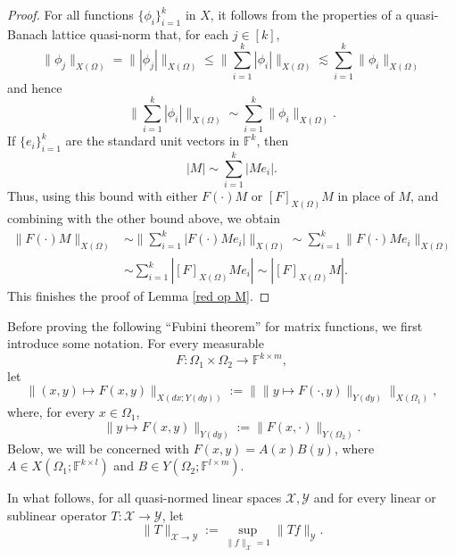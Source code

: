 \documentclass[11pt, reqno]{amsart}
\theoremstyle{definition}
\theoremstyle{remark}
\numberwithin{equation}{section}
\newcommand{\F}{\mathbb F}
\begin{document}
\begin{proof}
For all functions $\{\phi_i\}_{i=1}^k$ in $X$,
it follows from the properties of a
quasi-Banach lattice quasi-norm that, for each $j\in[k]$,
$$
\|\phi_j\|_{X(\Omega)}=\big\| |\phi_j| \big\|_{X(\Omega)} \leq\Bigg\|\sum_{i=1}^k|\phi_i|\Bigg\|_{X(\Omega)}
\lesssim \sum_{i=1}^k\|\phi_i\|_{X(\Omega)}
$$
and hence
$$
\Bigg\|\sum_{i=1}^k|\phi_i|\Bigg\|_{X(\Omega)}
\sim \sum_{i=1}^k\|\phi_i\|_{X(\Omega)}.
$$
If $\{e_i\}_{i=1}^k$ are the standard unit vectors in $\F^k$, then
\begin{equation*}
|M|\sim\sum_{i=1}^k |Me_i|.
\end{equation*}
Thus, using this bound with either $F(\cdot)M$ or $[F]_{X(\Omega)}M$ in place of $M$, and combining with the other bound above, we obtain
\begin{align*}
\|F(\cdot)M\|_{X(\Omega)}
&\sim\Bigg\|\sum_{i=1}^k|F(\cdot)Me_i| \Bigg\|_{X(\Omega)}
\sim\sum_{i=1}^k\big\| F(\cdot)Me_i \big\|_{X(\Omega)}\\
&\sim\sum_{i=1}^k| [F]_{X(\Omega)}Me_i|
\sim|[F]_{X(\Omega)}M|.
\end{align*}
This finishes the proof of Lemma \ref{red op M}.
\end{proof}

Before proving the following ``Fubini theorem'' for matrix functions, we first introduce some notation.
For every measurable
\begin{equation*}
  F:\Omega_1\times\Omega_2\to\F^{k\times m},
\end{equation*}
let
\begin{equation*}
  \|(x,y)\mapsto F(x,y)\|_{X(dx;Y(dy))}
  := \big\| \|y\mapsto F(\cdot,y)\|_{Y(dy)} \big\|_{X(\Omega_1)},
\end{equation*}
where, for every $x\in \Omega_1$,
\begin{equation*}
  \|y\mapsto F(x,y)\|_{Y(dy)}
  := \|F(x,\cdot)\|_{Y(\Omega_2)}.
\end{equation*}
Below, we will be concerned with $F(x,y)=A(x)B(y)$, where $A\in X(\Omega_1;\F^{k\times l})$ and $B\in Y(\Omega_2;\F^{l\times m})$.

In what follows, for all quasi-normed linear spaces $\mathscr X,\mathscr Y$
and for every linear or sublinear operator
$T: \mathscr X \to \mathscr Y$, let
$$
\|T\|_{\mathscr X\to \mathscr Y}
:= \sup_{\|f\|_{\mathscr X} = 1} \|Tf\|_{\mathscr Y} .
$$
\end{document}

